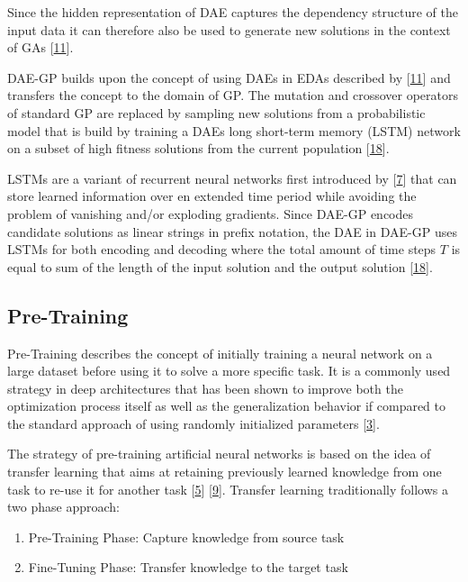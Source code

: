 \documentclass[
  11pt,
]{article}
\providecommand{\tightlist}{%
  \setlength{\itemsep}{0pt}\setlength{\parskip}{0pt}}
\begin{document}
Since the hidden representation of DAE captures the dependency structure
of the input data it can therefore also be used to generate new
solutions in the context of GAs
{[}\protect\hyperlink{ref-harmless_overfitting_eda}{11}{]}.

DAE-GP builds upon the concept of using DAEs in EDAs described by
{[}\protect\hyperlink{ref-harmless_overfitting_eda}{11}{]} and transfers
the concept to the domain of GP. The mutation and crossover operators of
standard GP are replaced by sampling new solutions from a probabilistic
model that is build by training a DAEs long short-term memory (LSTM)
network on a subset of high fitness solutions from the current
population {[}\protect\hyperlink{ref-dae-gp_2020_rtree}{18}{]}.

LSTMs are a variant of recurrent neural networks first introduced by
{[}\protect\hyperlink{ref-lstm_orig}{7}{]} that can store learned
information over en extended time period while avoiding the problem of
vanishing and/or exploding gradients. Since DAE-GP encodes candidate
solutions as linear strings in prefix notation, the DAE in DAE-GP uses
LSTMs for both encoding and decoding where the total amount of time
steps \(T\) is equal to sum of the length of the input solution and the
output solution {[}\protect\hyperlink{ref-dae-gp_2020_rtree}{18}{]}.

\hypertarget{pre-training}{%
\subsection{Pre-Training}\label{pre-training}}

Pre-Training describes the concept of initially training a neural
network on a large dataset before using it to solve a more specific
task. It is a commonly used strategy in deep architectures that has been
shown to improve both the optimization process itself as well as the
generalization behavior if compared to the standard approach of using
randomly initialized parameters
{[}\protect\hyperlink{ref-pmlr-v5-erhan09a}{3}{]}.

The strategy of pre-training artificial neural networks is based on the
idea of transfer learning that aims at retaining previously learned
knowledge from one task to re-use it for another task
{[}\protect\hyperlink{ref-HAN2021225}{5}{]}
{[}\protect\hyperlink{ref-survey_transfer_learning}{9}{]}. Transfer
learning traditionally follows a two phase approach:

\begin{enumerate}
\def\labelenumi{\arabic{enumi}.}
\tightlist
\item
  Pre-Training Phase: Capture knowledge from source task
\item
  Fine-Tuning Phase: Transfer knowledge to the target task
\end{enumerate}
\end{document}
